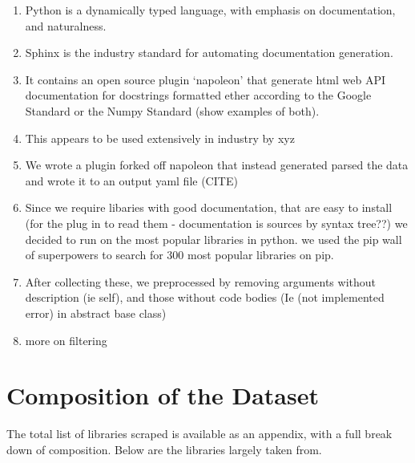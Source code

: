 \begin{enumerate}
    \item Python is a dynamically typed language, with emphasis on documentation, and naturalness.
    \item Sphinx is the industry standard for automating documentation generation.
    \item It contains an open source plugin `napoleon' that generate html web API documentation for docstrings formatted ether according to the Google Standard or the Numpy Standard (show examples of both).
    \item This appears to be used extensively in industry by xyz
    \item We wrote a plugin forked off napoleon that instead generated parsed the data and wrote it to an output yaml file (CITE)
    \item Since we require libaries with good documentation, that are easy to install (for the plug in to read them - documentation is sources by syntax tree??) we decided to run on the most popular libraries in python. we used the pip wall of superpowers to search for 300 most popular libraries on pip.
    \item After collecting these, we preprocessed by removing arguments without description (ie self), and those without code bodies (Ie (not implemented error) in abstract base class)
    \item more on filtering
\end{enumerate}




\section{Composition of the Dataset} %
\label{sec:composition_of_the_dataset}

The total list of libraries scraped is available as an appendix, with a full break down of composition. Below are the libraries largely taken from. 

